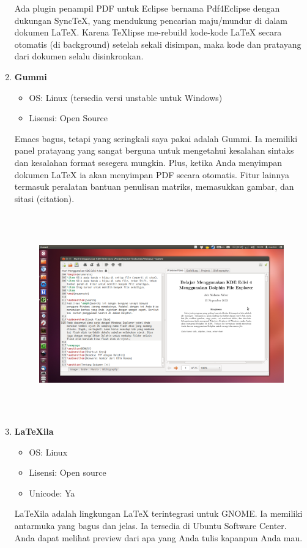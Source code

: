 \begin{enumerate}
Ada plugin penampil PDF untuk Eclipse bernama Pdf4Eclipse dengan dukungan SyncTeX, yang mendukung pencarian maju/mundur di dalam dokumen LaTeX. Karena TeXlipse me-rebuild kode-kode LaTeX secara otomatis (di background) setelah sekali disimpan, maka kode dan pratayang dari dokumen selalu disinkronkan.

\item \textbf{Gummi}
\begin{itemize}
\item OS: Linux (tersedia versi unstable untuk Windows)
\item Lisensi: Open Source
\end{itemize}


Emacs bagus, tetapi yang seringkali saya pakai adalah Gummi. Ia memiliki panel pratayang yang sangat berguna untuk mengetahui kesalahan sintaks dan kesalahan format sesegera mungkin. Plus, ketika Anda menyimpan dokumen LaTeX ia akan menyimpan PDF secara otomatis. Fitur lainnya termasuk peralatan bantuan penulisan matriks, memasukkan gambar, dan 
sitasi (citation).
\par \vspace{12pt}

\begin{figure}[ht]

\includegraphics[width=15.45cm,height=8.68cm]{gambar/image10.jpg}
\end{figure}

\item \textbf{LaTeXila}
\begin{itemize}
\item OS: Linux
\item Lisensi: Open source
\item Unicode: Ya
\end{itemize}
\hspace{0,5in}LaTeXila adalah lingkungan LaTeX terintegrasi untuk GNOME. Ia memiliki antarmuka yang bagus dan jelas. Ia tersedia di Ubuntu Software Center. Anda dapat melihat preview dari apa yang Anda tulis kapanpun Anda mau.
\par \vspace{12pt}


\end{enumerate}
